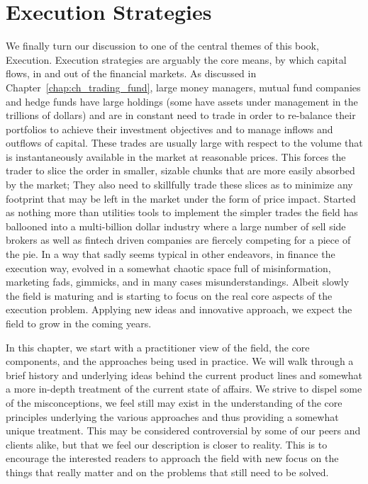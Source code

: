 \chapter{Execution Strategies\label{chap:ch_exec_models}}

We finally turn our discussion to one of the central themes of this book, Execution. Execution strategies are arguably the core means, by which capital flows, in and out of the financial markets.  As discussed in Chapter~\ref{chap:ch_trading_fund}, large money managers, mutual fund companies and hedge funds have large holdings (some have assets under management in the trillions of dollars) and are in constant need to trade in order to re-balance their portfolios to achieve their investment objectives and to manage inflows and  outflows of capital. These trades are usually large with respect to the volume that is instantaneously available in the market at reasonable prices. This forces the trader to slice the order in smaller, sizable chunks that are more easily absorbed by the market; They also need to skillfully trade these slices as to minimize any footprint that may be left in the market under the form of price impact. Started as nothing more than utilities tools to implement the simpler trades the field has ballooned into a multi-billion dollar industry where a large number of sell side brokers as well as fintech driven companies are fiercely competing for a piece of the pie. In a way that sadly seems typical in other endeavors, in finance the execution way, evolved in a somewhat chaotic space full of misinformation, marketing fads, gimmicks, and in many cases misunderstandings. Albeit slowly the field is maturing and is starting to focus on the real core aspects of the execution problem. Applying new ideas and innovative approach, we expect the field to grow in the coming years.


In this chapter, we start with a practitioner view of the field, the core components, and the approaches being used in practice. We will walk through a brief history and underlying ideas behind the current product lines and somewhat a more in-depth treatment of the current state of affairs. We strive to dispel some of the misconceptions, we feel still may exist in the understanding of the core principles underlying the various approaches and thus providing a somewhat unique treatment. This may be considered controversial by some of our peers and clients alike, but that we feel our description is closer to reality. This is to encourage the interested readers to approach the field with new focus on the things that really matter and on the problems that still need to be solved.


